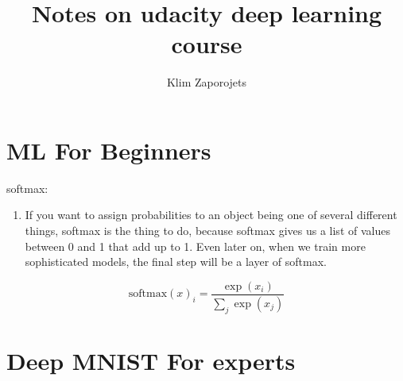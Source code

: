 \documentclass[11pt,a4paper]{article}
\author{Klim Zaporojets}
\title{Notes on udacity deep learning course}
\begin{document}
\section{ML For Beginners}
softmax:
\begin{enumerate}
	\item If you want to assign probabilities to an object being one of several different things, softmax is the thing to do, because softmax gives us a list of values between 0 and 1 that add up to 1. Even later on, when we train more sophisticated models, the final step will be a layer of softmax.
\end{enumerate}

$$\text{softmax}(x)_i = \dfrac{\exp(x_i)}{\sum_j{\exp(x_j)}}$$

\section{Deep MNIST For experts}
\end{document}
